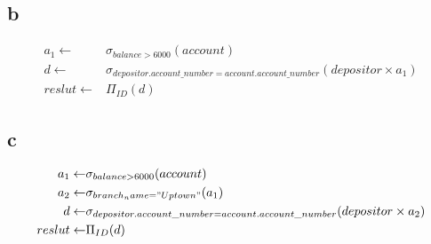 \documentclass{article}
\begin{document}
    \subsection*{b} 
    \begin{equation*}
        \begin{split}
            a_1\leftarrow & \sigma_{balance>6000}(account)\\
            d\leftarrow & \sigma_{depositor.account\_number=account.account\_number}(depositor\times a_1)\\
            reslut\leftarrow & \Pi_{ID}(d)
        \end{split}
    \end{equation*}
    \subsection*{c}
    \begin{equation*}
        \begin{split}
            a_1\leftarrow & \sigma_{balance>6000}(account)\\
            a_2\leftarrow & \sigma_{branch_name="Uptown"}(a_1)\\
            d\leftarrow & \sigma_{depositor.account\_number=account.account\_number}(depositor\times a_2)\\
            reslut\leftarrow & \Pi_{ID}(d)
        \end{split}
    \end{equation*}
\end{document}
